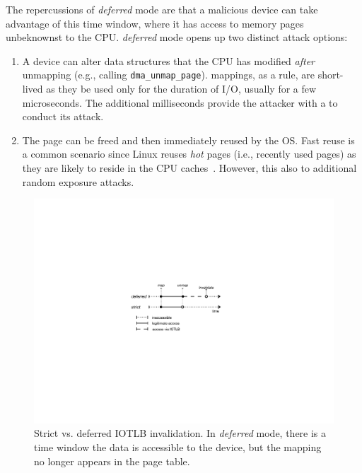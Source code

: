 The repercussions of \emph{deferred} mode are that a malicious device can take advantage of this time window, where it has access to memory pages unbeknownst to the CPU. \DIFaddbegin {}\DIFaddend \emph{deferred} mode opens up two distinct attack options:

\begin{enumerate}[labelindent=0pt]
    \item A device can alter data structures that the CPU has modified \emph{after} unmapping (e.g., calling \texttt{dma\_unmap\_page}).
    \iova{} mappings, as a rule, are short-lived as they \DIFdelbegin {}\DIFdelend \DIFaddbegin {}\DIFaddend be used only for the duration of \DIFaddbegin {}\DIFaddend I/O, usually for a few microseconds. The additional milliseconds provide the attacker with a \DIFdelbegin {}\DIFdelend \DIFaddbegin {}\DIFaddend to conduct its attack.
    \item The page can be freed and then immediately reused by the OS. Fast reuse is a common scenario since Linux reuses \emph{hot} pages (i.e., recently used pages) as they are likely to reside in the CPU caches~\cite{hotcold}. However, this also \DIFdelbegin {}\DIFdelend \DIFaddbegin {}\DIFaddend to additional random exposure attacks.
\end{enumerate}



\begin{figure}[t]
    \centering
    \includegraphics[width=0.75\columnwidth]{figs/strict.pdf}
    \caption{Strict vs. deferred IOTLB invalidation. In \emph{deferred} mode, there is a time window \DIFdelbeginFL {}\DIFdelendFL \DIFaddbeginFL {}\DIFaddendFL the data is accessible to the device, but the mapping no longer appears in the page table.}
    \label{fig:deferred}
\end{figure}

